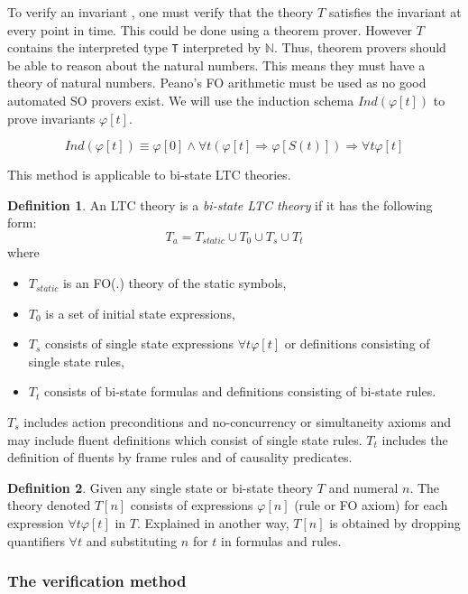 \documentclass[10pt,a4paper]{article}
\theoremstyle{definition}
\newtheorem{definition}{Definition}[section]
\begin{document}
To verify an invariant , one must verify that the theory $T$ satisfies the invariant at every point in time. This could be done using a theorem prover. However $T$ contains the interpreted type \texttt{T} interpreted by $\mathbb{N}$. Thus, theorem provers should be able to reason about the natural numbers. This means they must have a theory of natural numbers. Peano's FO arithmetic must be used as no good automated SO provers exist. We will use the induction schema $Ind(\varphi[t])$ to prove invariants $\varphi[t]$.

$$Ind(\varphi[t]) \equiv \varphi[0] \land \forall t(\varphi[t] \Rightarrow \varphi[S(t)]) \Rightarrow \forall t \varphi[t]$$

This method is applicable to bi-state LTC theories. 

\begin{definition} 
An LTC theory is a \textit{bi-state LTC theory} if it has the following form: $$T_a = T_{static} \cup T_0 \cup T_s \cup T_t$$ where
\begin{itemize}
	\item $T_{static}$ is an FO(.) theory of the static symbols,
	\item $T_0$ is a set of initial state expressions,
	\item $T_s$ consists of single state expressions $\forall t \varphi[t]$ or definitions consisting of single state rules,
	\item $T_t$ consists of bi-state formulas and definitions consisting of bi-state rules.
\end{itemize}
$T_s$ includes action preconditions and no-concurrency or simultaneity axioms and may include fluent definitions which consist of single state rules. $T_t$ includes the definition of fluents by frame rules and of causality predicates.
\end{definition}

\begin{definition}
Given any single state or bi-state theory $T$ and numeral $n$. The theory denoted $T[n]$ consists of expressions $\varphi[n]$ (rule or FO axiom) for each expression $\forall t \varphi[t]$ in $T$. Explained in another way, $T[n]$ is obtained by dropping quantifiers $\forall t$ and substituting $n$ for $t$ in formulas and rules.
\end{definition}

\subsubsection{The verification method}
\end{document}
